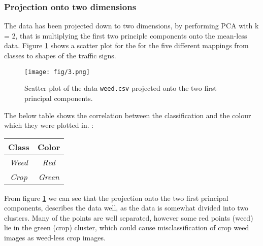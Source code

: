 \documentclass{article}
\begin{document}
\subsubsection{Projection onto two dimensions}
The data has been projected down to two dimensions, by performing PCA with k = 2, that is multiplying the first two principle components onto the mean-less data. Figure \ref{fig:scatter} shows a scatter plot for the for the five different mappings from classes to shapes of the traffic signs.
\begin{figure}[H]
  \centering
  \texttt{[image: fig/3.png]}
  \caption{Scatter plot of the data \texttt{weed.csv} projected onto the two first principal components.}
  \label{fig:scatter}
\end{figure}
The below table shows the correlation between the classification and the colour which they were plotted in. :
\begin{table}[H]
  \centering
  \begin{tabular}{|c|c|}
  \hline
    \textsf{Class} & \textsf{Color}\\
    \hline
    \textsl{Weed} & \textsl{Red} \\
    \hline
    \textsl{Crop} & \textsl{Green} \\
    \hline
  \end{tabular}
\end{table}
From figure \ref{fig:scatter} we can see that the projection onto the two first principal components, describes the data well, as the data is somewhat divided into two clusters. Many of the points are well separated, however some red points (weed) lie in the green (crop) cluster, which could cause misclassification of crop weed images as weed-less crop images.
\end{document}
